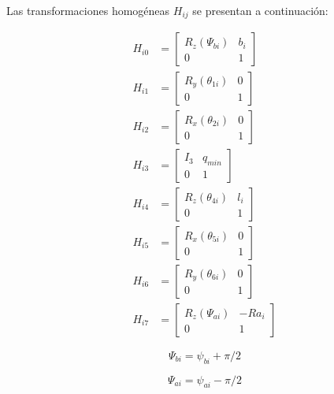 Las transformaciones homogéneas $H_{ij}$ se presentan a
continuación:

\begin{subequations}
 \begin{align}
  H_{i0} & = \begin{bmatrix}
R_z(\Psi_{bi}) & b_i\\
0 & 1
\end{bmatrix} \\
H_{i1} & = \begin{bmatrix}
R_y(\theta_{1i}) & 0\\
0 & 1
\end{bmatrix} \\
H_{i2} & = \begin{bmatrix}
R_x(\theta_{2i}) & 0\\
0 & 1
\end{bmatrix} \\
H_{i3} & = \begin{bmatrix}
I_3 & q_{min}\\
0 & 1
\end{bmatrix}\\
H_{i4} & = \begin{bmatrix}
R_z(\theta_{4i}) & l_i\\
0 & 1
\end{bmatrix} \\
H_{i5} & = \begin{bmatrix}
R_x(\theta_{5i}) & 0\\
0 & 1
\end{bmatrix} \\
H_{i6} & = \begin{bmatrix}
R_y(\theta_{6i}) & 0\\
0 & 1
\end{bmatrix} \\
H_{i7} & = \begin{bmatrix}
R_z(\Psi_{ai}) & -Ra_i\\
0 & 1
\end{bmatrix}
 \end{align}
\end{subequations}

\begin{equation}
 \Psi_{bi}  = \psi_{bi} + \pi/2
\end{equation}

\begin{equation}
 \Psi_{ai}  = \psi_{ai} - \pi/2
\end{equation}

